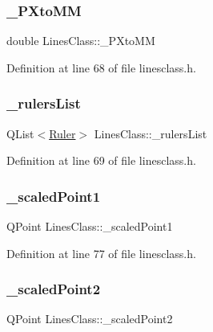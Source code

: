 \subsubsection{\texorpdfstring{\_PXtoMM}{\_PXtoMM}}
{\footnotesize\ttfamily double Lines\+Class\+::\+\_\+\+P\+Xto\+MM\hspace{0.3cm}{\ttfamily [private]}}



Definition at line 68 of file linesclass.\+h.

\mbox{\label{class_lines_class_a433f7193cb50a8372c7c02289b0416d8}} 
\subsubsection{\texorpdfstring{\_rulersList}{\_rulersList}}
{\footnotesize\ttfamily Q\+List$<$\mbox{\hyperlink{class_ruler}{Ruler}}$>$ Lines\+Class\+::\+\_\+rulers\+List\hspace{0.3cm}{\ttfamily [private]}}



Definition at line 69 of file linesclass.\+h.

\mbox{\label{class_lines_class_aaac1333fecbdb6682e43e6d2bfdcb4b3}} 
\subsubsection{\texorpdfstring{\_scaledPoint1}{\_scaledPoint1}}
{\footnotesize\ttfamily Q\+Point Lines\+Class\+::\+\_\+scaled\+Point1\hspace{0.3cm}{\ttfamily [private]}}



Definition at line 77 of file linesclass.\+h.

\mbox{\label{class_lines_class_ab9573e0491994cddee75df125e66d037}} 
\subsubsection{\texorpdfstring{\_scaledPoint2}{\_scaledPoint2}}
{\footnotesize\ttfamily Q\+Point Lines\+Class\+::\+\_\+scaled\+Point2\hspace{0.3cm}{\ttfamily [private]}}



